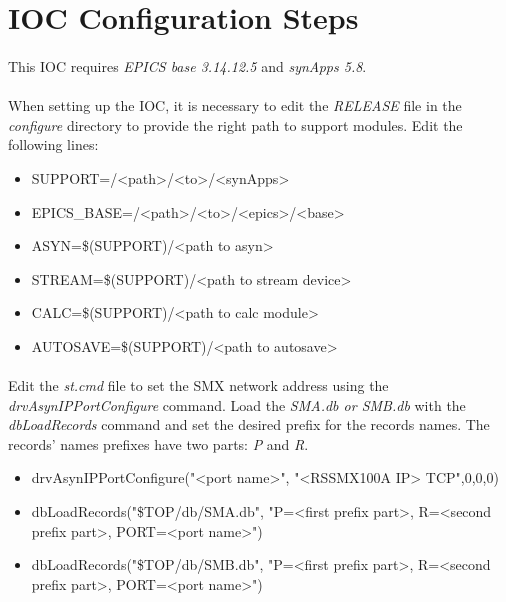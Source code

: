 \documentclass[openany]{article}
\begin{document}
\section{IOC Configuration Steps}

	\paragraph{} This IOC requires \emph{EPICS base 3.14.12.5} and \emph{synApps 5.8}.

	\paragraph{} When setting up the IOC, it is necessary to edit the \emph{RELEASE} file in the \emph{configure} directory to provide the right path to support modules. Edit the following lines:

	\begin{itemize}
		\item[] SUPPORT=/\textless path\textgreater/\textless to\textgreater/\textless synApps\textgreater
		\item[] EPICS\_BASE=/\textless path\textgreater/\textless to\textgreater/\textless epics\textgreater/\textless base\textgreater
		\item[] ASYN=\$(SUPPORT)/\textless path to asyn\textgreater
		\item[] STREAM=\$(SUPPORT)/\textless path to stream device\textgreater
		\item[] CALC=\$(SUPPORT)/\textless path to calc module\textgreater
		\item[] AUTOSAVE=\$(SUPPORT)/\textless path to autosave\textgreater
	\end{itemize}

	\paragraph{} Edit the \emph{st.cmd} file to set the SMX network address using the \emph{drvAsynIPPortConfigure} command. Load the \emph{SMA.db or SMB.db} with the \emph{dbLoadRecords} command and set the desired prefix for the records names. The records' names prefixes have two parts: \emph{P} and \emph{R}.

	\begin{itemize}
		\item[] drvAsynIPPortConfigure("\textless port name\textgreater", "\textless RSSMX100A IP{\textgreater} TCP",0,0,0)
		\item[] dbLoadRecords("\${TOP}/db/SMA.db", "P=\textless first prefix part\textgreater, R=\textless second prefix part\textgreater, PORT=\textless port name\textgreater")
		\item[] dbLoadRecords("\${TOP}/db/SMB.db", "P=\textless first prefix part\textgreater, R=\textless second prefix part\textgreater, PORT=\textless port name\textgreater")
	\end{itemize}
\end{document}
